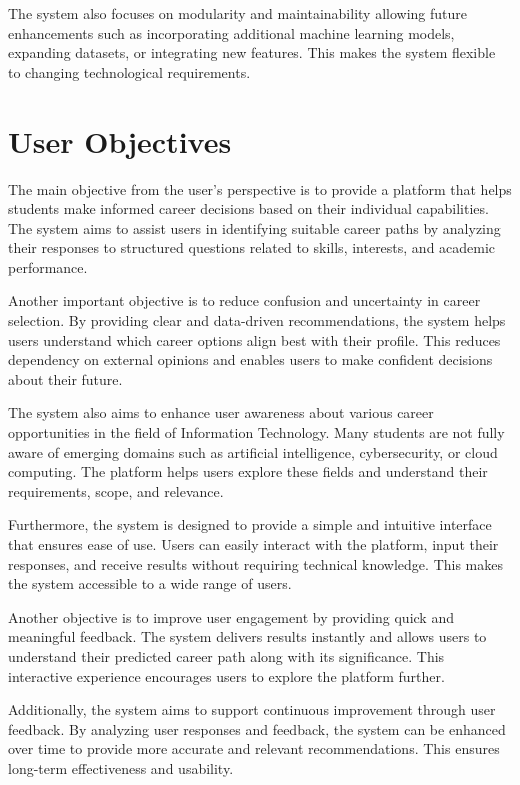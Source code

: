 \documentclass[12pt,a4paper]{report}
\begin{document}
{The system also focuses on modularity and maintainability allowing future enhancements such as incorporating additional machine learning models, expanding datasets, or integrating new features. This makes the system flexible to changing technological requirements.

\section{User Objectives}

The main objective from the user’s perspective is to provide a platform that helps students make informed career decisions based on their individual capabilities. The system aims to assist users in identifying suitable career paths by analyzing their responses to structured questions related to skills, interests, and academic performance.

Another important objective is to reduce confusion and uncertainty in career selection. By providing clear and data-driven recommendations, the system helps users understand which career options align best with their profile. This reduces dependency on external opinions and enables users to make confident decisions about their future.

The system also aims to enhance user awareness about various career opportunities in the field of Information Technology. Many students are not fully aware of emerging domains such as artificial intelligence, cybersecurity, or cloud computing. The platform helps users explore these fields and understand their requirements, scope, and relevance.

Furthermore, the system is designed to provide a simple and intuitive interface that ensures ease of use. Users can easily interact with the platform, input their responses, and receive results without requiring technical knowledge. This makes the system accessible to a wide range of users.

Another objective is to improve user engagement by providing quick and meaningful feedback. The system delivers results instantly and allows users to understand their predicted career path along with its significance. This interactive experience encourages users to explore the platform further.

Additionally, the system aims to support continuous improvement through user feedback. By analyzing user responses and feedback, the system can be enhanced over time to provide more accurate and relevant recommendations. This ensures long-term effectiveness and usability.

}
\end{document}
